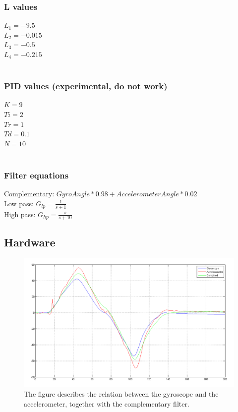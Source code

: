 \documentclass[a4paper]{article}
\begin{document}
\subsubsection*{L values}
$L_1=-9.5$\\
$L_2=-0.015$\\
$L_3=-0.5$\\
$L_4=-0.215$\\ \\

\subsubsection*{PID values (experimental, do not work)}
$K=9$\\
$Ti=2$\\
$Tr=1$\\
$Td=0.1$\\
$N=10$\\ \\

\subsubsection*{Filter equations}
Complementary: $GyroAngle * 0.98 + AccelerometerAngle*0.02$ \\
Low pass: $G_{lp} = \frac{1}{s+1}$\\
High pass: $G_{hp} = \frac{s}{s+10}$\\

\subsection{Hardware}

\begin{figure}[H]
 \centering
\includegraphics[scale=0.4]{pic/GyroAccCombAng.png}
\caption{The figure describes the relation between the gyroscope and the accelerometer, together with the complementary filter.}
\end{figure}
\end{document}
